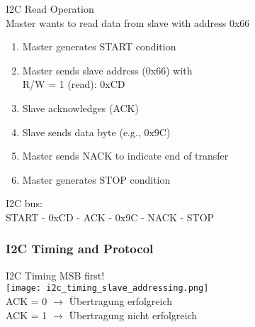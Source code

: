 \begin{example2}{I2C Read Operation}\\
Master wants to read data from slave with address 0x66
\tcblower
\begin{enumerate}
    \item Master generates START condition
    \item Master sends slave address (0x66) with \\ R/W = 1 (read): 0xCD
    \item Slave acknowledges (ACK)
    \item Slave sends data byte (e.g., 0x9C)
    \item Master sends NACK to indicate end of transfer
    \item Master generates STOP condition
\end{enumerate}
I2C bus:\\
START - 0xCD - ACK - 0x9C - NACK - STOP
\end{example2}

\multend

\subsubsection{I2C Timing and Protocol}

\begin{concept}{I2C Timing} MSB first!\\
    \texttt{[image: i2c\_timing\_slave\_addressing.png]}\\
    ACK = 0 $\rightarrow$ Übertragung erfolgreich\\
    ACK = 1 $\rightarrow$ Übertragung nicht erfolgreich
\end{concept}




